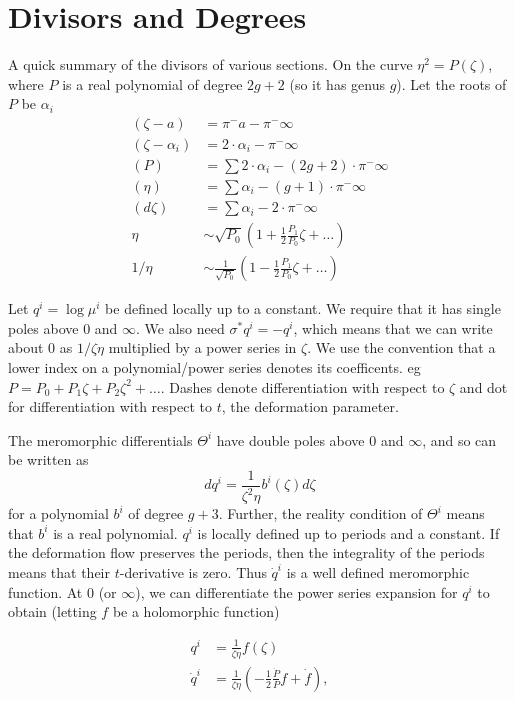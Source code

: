 \documentclass{article}
\begin{document}
\chapter{Divisors and Degrees} %
\label{chp:divisors}
A quick summary of the divisors of various sections. On the curve $\eta^2 = P(\zeta)$, where $P$ is a real polynomial of degree $2g+2$ (so it has genus $g$). Let the roots of $P$ be $\alpha_i$
\begin{align*}
(\zeta - a) &= \pi^-a - \pi^-\infty \\
(\zeta - \alpha_i) &= 2\cdot\alpha_i - \pi^-\infty \\
(P) &= \sum 2\cdot\alpha_i - (2g+2)\cdot\pi^-\infty \\
(\eta) &= \sum \alpha_i - (g+1)\cdot\pi^-\infty \\
(d\zeta) &= \sum \alpha_i - 2\cdot\pi^-\infty \\
\eta &\sim \sqrt{P_0}\left(1 + \frac{1}{2}\frac{P_1}{P_0}\zeta + \dots\right)\\
1/\eta &\sim \frac{1}{\sqrt{P_0}}\left(1 - \frac{1}{2}\frac{P_1}{P_0}\zeta + \dots\right)
\end{align*}

Let $q^i = \log \mu^i$ be defined locally up to a constant. We require that it has single poles above $0$ and $\infty$. We also need $\sigma^* q^i = - q^i$, which means that we can write about $0$ as $1/\zeta\eta$ multiplied by a power series in $\zeta$. We use the convention that a lower index on a polynomial/power series denotes its coefficents. eg $P = P_0 + P_1\zeta + P_2\zeta^2 + \dots$. Dashes denote differentiation with respect to $\zeta$ and dot for differentiation with respect to $t$, the deformation parameter.

The meromorphic differentials $\Theta^i$ have double poles above $0$ and $\infty$, and so can be written as
\[
dq^i = \frac{1}{\zeta^2\eta}b^i(\zeta) d\zeta
\]
for a polynomial $b^i$ of degree $g+3$. Further, the reality condition of $\Theta^i$ means that $b^i$ is a real polynomial. $q^i$ is locally defined up to periods and a constant. If the deformation flow preserves the periods, then the integrality of the periods means that their $t$-derivative is zero. Thus $\dot q^i$ is a well defined meromorphic function. At $0$ (or $\infty$), we can differentiate the power series expansion for $q^i$ to obtain (letting $f$ be a holomorphic function)

\begin{align*}
q^i &= \frac{1}{\zeta\eta}f(\zeta) \\
\dot q^i &= \frac{1}{\zeta\eta} \left(-\frac{1}{2}\frac{\dot P}{P}f + \dot f\right),
\end{align*}
\end{document}
